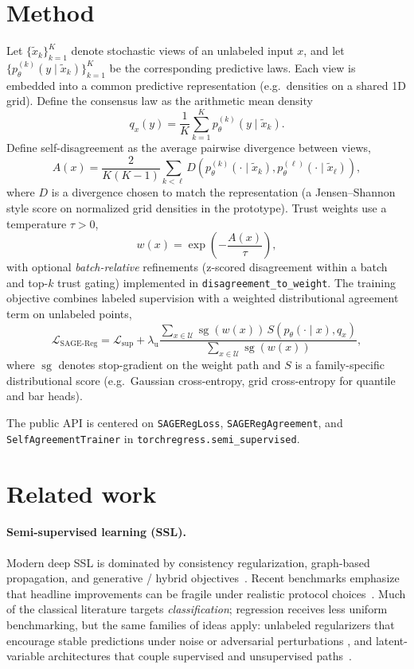 \documentclass{article}
\begin{document}
\section{Method}

Let $\{\tilde{x}_k\}_{k=1}^{K}$ denote stochastic views of an unlabeled input
$x$, and let $\{p_{\theta}^{(k)}(y \mid \tilde{x}_k)\}_{k=1}^{K}$ be the
corresponding predictive laws. Each view is embedded into a common predictive
representation (e.g.\ densities on a shared 1D grid). Define the consensus law
as the arithmetic mean density
\[
q_x(y) = \frac{1}{K}\sum_{k=1}^{K} p_{\theta}^{(k)}(y \mid \tilde{x}_k).
\]
Define self-disagreement as the average pairwise divergence between views,
\[
A(x) =
\frac{2}{K(K-1)}
\sum_{k < \ell}
D\!\left(p_{\theta}^{(k)}(\cdot \mid \tilde{x}_k), p_{\theta}^{(\ell)}(\cdot \mid \tilde{x}_\ell)\right),
\]
where $D$ is a divergence chosen to match the representation (a Jensen--Shannon
style score on normalized grid densities in the prototype). Trust weights use a
temperature $\tau > 0$,
\[
w(x) = \exp\!\left(-\frac{A(x)}{\tau}\right),
\]
with optional \emph{batch-relative} refinements (z-scored disagreement within a
batch and top-$k$ trust gating) implemented in
\texttt{disagreement\_to\_weight}. The training objective combines labeled
supervision with a weighted distributional agreement term on unlabeled points,
\[
\mathcal{L}_{\text{SAGE-Reg}}
=
\mathcal{L}_{\text{sup}}
+ \lambda_{\text{u}}
\frac{\sum_{x \in \mathcal{U}} \operatorname{sg}(w(x))
\, S\!\left(p_{\theta}(\cdot \mid x), q_x\right)}
{\sum_{x \in \mathcal{U}} \operatorname{sg}(w(x))},
\]
where $\operatorname{sg}$ denotes stop-gradient on the weight path and
$S$ is a family-specific distributional score (e.g.\ Gaussian cross-entropy,
grid cross-entropy for quantile and bar heads).

The public API is centered on \texttt{SAGERegLoss}, \texttt{SAGERegAgreement},
and \texttt{SelfAgreementTrainer} in \texttt{torchregress.semi\_supervised}.

\section{Related work}

\paragraph{Semi-supervised learning (SSL).}
Modern deep SSL is dominated by consistency regularization, graph-based
propagation, and generative / hybrid objectives~\citep{chapelle2006semisupervised}.
Recent benchmarks emphasize that headline improvements can be fragile under
realistic protocol choices~\citep{oliver2018realistic}. Much of the classical
literature targets \emph{classification}; regression receives less uniform
benchmarking, but the same families of ideas apply: unlabeled regularizers that
encourage stable predictions under noise or adversarial perturbations
\citep{miyato2018virtual}, and latent-variable architectures that couple
supervised and unsupervised paths~\citep{rasmus2015semisupervised}.
\end{document}
